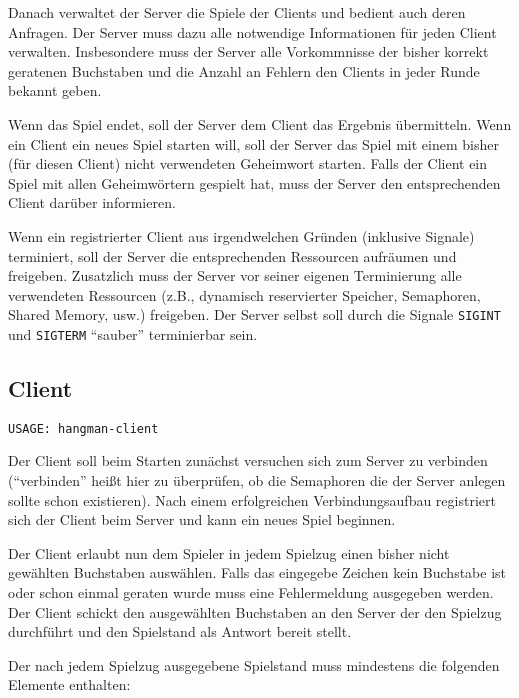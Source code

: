 Danach verwaltet der Server die Spiele der Clients und bedient auch deren
Anfragen.  Der Server muss dazu alle notwendige Informationen für jeden Client
verwalten. Insbesondere muss der Server alle Vorkommnisse der bisher korrekt
geratenen Buchstaben und die Anzahl an Fehlern den Clients in jeder Runde
bekannt geben.

Wenn das Spiel endet, soll der Server dem Client das Ergebnis übermitteln.
Wenn ein Client ein neues Spiel starten will, soll der Server das Spiel mit
einem bisher (für diesen Client) nicht verwendeten Geheimwort starten.  Falls
der Client ein Spiel mit allen Geheimwörtern gespielt hat, muss der Server den
entsprechenden Client darüber informieren.

Wenn ein registrierter Client aus irgendwelchen Gründen (inklusive Signale)
terminiert, soll der Server die entsprechenden Ressourcen aufräumen und
freigeben.  Zusatzlich muss der Server vor seiner eigenen Terminierung alle
verwendeten Ressourcen (z.B., dynamisch reservierter Speicher, Semaphoren,
Shared Memory, usw.) freigeben.  Der Server selbst soll durch die Signale
\verb|SIGINT| und \verb|SIGTERM| "`sauber"' terminierbar sein.



\subsection*{Client}

\begin{verbatim}
USAGE: hangman-client
\end{verbatim}

Der Client soll beim Starten zunächst versuchen sich zum Server zu verbinden
("`verbinden"' heißt hier zu überprüfen, ob die Semaphoren die der Server
anlegen sollte schon existieren).  Nach einem erfolgreichen Verbindungsaufbau
registriert sich der Client beim Server und kann ein neues Spiel beginnen.

Der Client erlaubt nun dem Spieler in jedem Spielzug einen bisher nicht
gewählten Buchstaben auswählen.  Falls das eingegebe Zeichen kein Buchstabe ist
oder schon einmal geraten wurde muss eine Fehlermeldung ausgegeben werden. Der
Client schickt den ausgewählten Buchstaben an den Server der den Spielzug
durchführt und den Spielstand als Antwort bereit stellt.

Der nach jedem Spielzug ausgegebene Spielstand muss mindestens die folgenden
Elemente enthalten:


